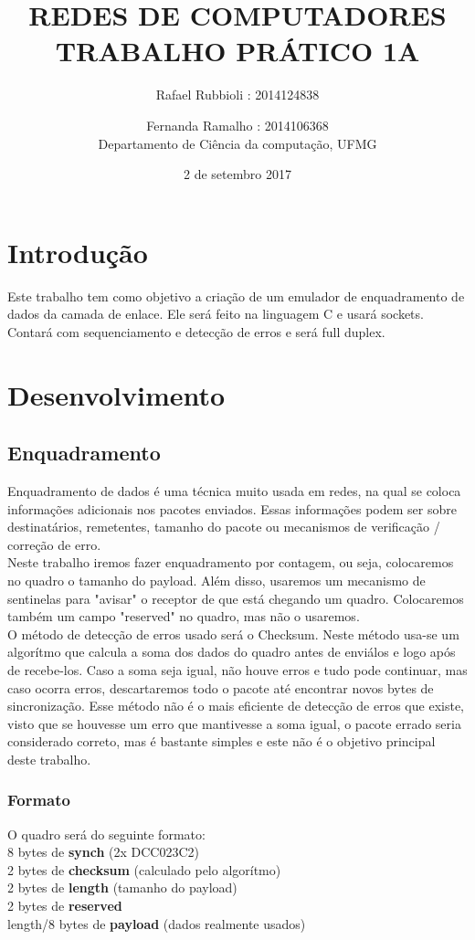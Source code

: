 \documentclass[10pt]{article}
\title{\LARGE \textbf{\uppercase{REDES DE COMPUTADORES\\Trabalho prático 1A}} }
\date{2 de setembro 2017}
\author{Rafael Rubbioli : 2014124838\\
\and Fernanda Ramalho : 2014106368 \\ Departamento de Ciência da computação, UFMG}
\begin{document}
	\maketitle 
	\section{Introdução}
		Este trabalho tem como objetivo a criação de um emulador de enquadramento de dados da camada de enlace. Ele será feito na linguagem C e usará sockets. Contará com sequenciamento e detecção de erros e será full duplex.
	\section{Desenvolvimento}
		\subsection{Enquadramento}
			Enquadramento de dados é uma técnica muito usada em redes, na qual se coloca informações adicionais nos pacotes enviados. Essas informações podem ser sobre destinatários, remetentes, tamanho do pacote ou mecanismos de verificação / correção de erro. 
			\\ Neste trabalho iremos fazer enquadramento por contagem, ou seja, colocaremos no quadro o tamanho do payload. Além disso, usaremos um mecanismo de sentinelas para "avisar" o receptor de que está chegando um quadro. Colocaremos também um campo "reserved" no quadro, mas não o usaremos.
			\\ O método de detecção de erros usado será o Checksum. Neste método usa-se um algorítmo que calcula a soma dos dados do quadro antes de enviálos e logo após de recebe-los. Caso a soma seja igual, não houve erros e tudo pode continuar, mas caso ocorra erros, descartaremos todo o pacote até encontrar novos bytes de sincronização. Esse método não é o mais eficiente de detecção de erros que existe, visto que se houvesse um erro que mantivesse a soma igual, o pacote errado seria considerado correto, mas é bastante simples e este não é o objetivo principal deste trabalho.
			\subsubsection{Formato}
			O quadro será do seguinte formato: 
			\\8 bytes de \textbf{synch} (2x DCC023C2)
			\\2 bytes de \textbf{checksum} (calculado pelo algorítmo)
			\\2 bytes de \textbf{length}  (tamanho do payload)
			\\2 bytes de \textbf{reserved}
			\\length/8 bytes de \textbf{payload} (dados realmente usados)
\end{document}

